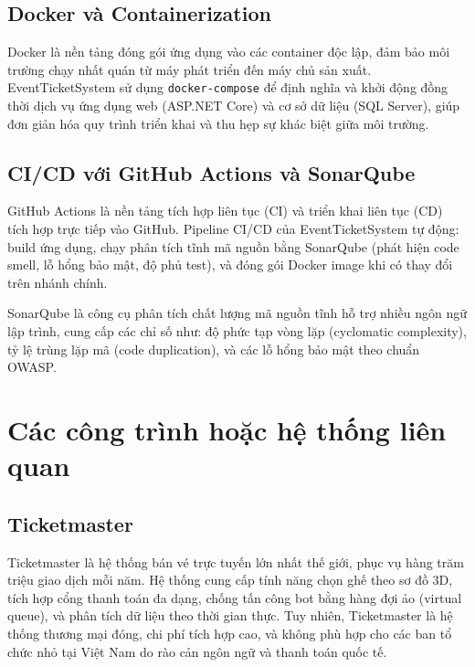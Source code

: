 \documentclass[../main.tex]{subfiles}
\begin{document}
\subsection{Docker và Containerization}

Docker là nền tảng đóng gói ứng dụng vào các container độc lập, đảm bảo môi trường chạy nhất quán từ máy phát triển đến máy chủ sản xuất. EventTicketSystem sử dụng \texttt{docker-compose} để định nghĩa và khởi động đồng thời dịch vụ ứng dụng web (ASP.NET Core) và cơ sở dữ liệu (SQL Server), giúp đơn giản hóa quy trình triển khai và thu hẹp sự khác biệt giữa môi trường.

\subsection{CI/CD với GitHub Actions và SonarQube}

GitHub Actions là nền tảng tích hợp liên tục (CI) và triển khai liên tục (CD) tích hợp trực tiếp vào GitHub. Pipeline CI/CD của EventTicketSystem tự động: build ứng dụng, chạy phân tích tĩnh mã nguồn bằng SonarQube (phát hiện code smell, lỗ hổng bảo mật, độ phủ test), và đóng gói Docker image khi có thay đổi trên nhánh chính.

SonarQube là công cụ phân tích chất lượng mã nguồn tĩnh hỗ trợ nhiều ngôn ngữ lập trình, cung cấp các chỉ số như: độ phức tạp vòng lặp (cyclomatic complexity), tỷ lệ trùng lặp mã (code duplication), và các lỗ hổng bảo mật theo chuẩn OWASP.

\section{Các công trình hoặc hệ thống liên quan}

\subsection{Ticketmaster}

Ticketmaster là hệ thống bán vé trực tuyến lớn nhất thế giới, phục vụ hàng trăm triệu giao dịch mỗi năm. Hệ thống cung cấp tính năng chọn ghế theo sơ đồ 3D, tích hợp cổng thanh toán đa dạng, chống tấn công bot bằng hàng đợi ảo (virtual queue), và phân tích dữ liệu theo thời gian thực. Tuy nhiên, Ticketmaster là hệ thống thương mại đóng, chi phí tích hợp cao, và không phù hợp cho các ban tổ chức nhỏ tại Việt Nam do rào cản ngôn ngữ và thanh toán quốc tế.
\end{document}
